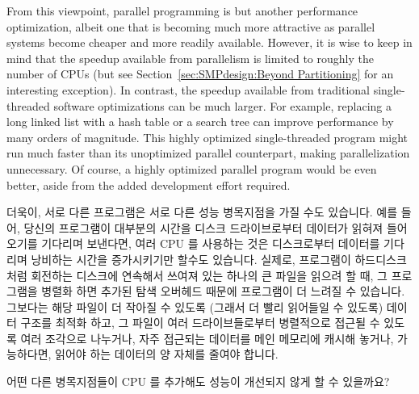 From this viewpoint, parallel programming is but another performance
optimization, albeit one that is becoming much more attractive
as parallel systems become cheaper and more readily available.
However, it is wise to keep in mind that the speedup available from
parallelism is limited to roughly the number of CPUs
(but see Section~\ref{sec:SMPdesign:Beyond Partitioning}
for an interesting exception).
In contrast, the speedup available from traditional single-threaded
software optimizations can be much larger.
For example, replacing a long linked list with a hash table
or a search tree can improve performance by many orders of magnitude.
This highly optimized single-threaded program might run much
faster than its unoptimized parallel counterpart, making parallelization
unnecessary.
Of course, a highly optimized parallel program would be even better,
aside from the added development effort required.
\fi

더욱이, 서로 다른 프로그램은 서로 다른 성능 병목지점을 가질 수도 있습니다.
예를 들어, 당신의 프로그램이 대부분의 시간을 디스크 드라이브로부터 데이터가
읽혀져 들어오기를 기다리며 보낸다면, 여러 CPU 를 사용하는 것은 디스크로부터
데이터를 기다리며 낭비하는 시간을 증가시키기만 할수도 있습니다.
실제로, 프로그램이 하드디스크처럼 회전하는 디스크에 연속해서 쓰여져 있는 하나의
큰 파일을 읽으려 할 때, 그 프로그램을 병렬화 하면 추가된 탐색 오버헤드 때문에
프로그램이 더 느려질 수 있습니다.
그보다는 해당 파일이 더 작아질 수 있도록 (그래서 더 빨리 읽어들일 수 있도록)
데이터 구조를 최적화 하고, 그 파일이 여러 드라이브들로부터 병렬적으로 접근될 수
있도록 여러 조각으로 나누거나, 자주 접근되는 데이터를 메인 메모리에 캐시해
놓거나, 가능하다면, 읽어야 하는 데이터의 양 자체를 줄여야 합니다.

\QuickQuiz{}
	어떤 다른 병목지점들이 CPU 를 추가해도 성능이 개선되지 않게 할 수
	있을까요?
	\iffalse

